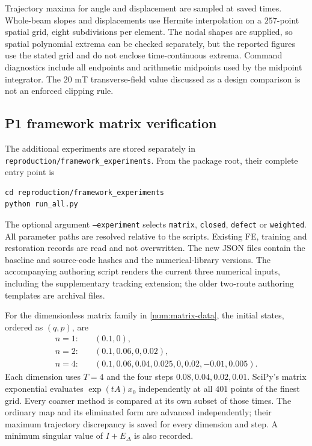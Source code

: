 Trajectory maxima for angle and displacement are sampled at saved
times. Whole-beam slopes and displacements use Hermite interpolation
on a $257$-point spatial grid, eight subdivisions per element.
The nodal shapes are supplied, so spatial polynomial extrema can
be checked separately, but the reported figures use the stated
grid and do not enclose time-continuous extrema.
Command diagnostics include all endpoints and arithmetic midpoints
used by the midpoint integrator. The $20$ mT transverse-field value
discussed as a design comparison is not an enforced clipping rule.

\subsection{P1 framework matrix verification}
\label{sx:framework-matrix}
The additional experiments are stored separately in
\texttt{reproduction/framework\_experiments}. From the package root,
their complete entry point is
\begin{verbatim}
cd reproduction/framework_experiments
python run_all.py
\end{verbatim}
The optional argument \texttt{--experiment} selects
\texttt{matrix}, \texttt{closed}, \texttt{defect} or \texttt{weighted}.
All parameter paths are resolved relative to the scripts. Existing FE,
training and restoration records are read and not overwritten.
The new JSON files contain the baseline and source-code hashes and the
numerical-library versions. The accompanying authoring script renders
the current three numerical inputs, including the supplementary tracking
extension; the older two-route authoring templates are archival files.

For the dimensionless matrix family in \eqref{num:matrix-data}, the
initial states, ordered as $(q,p)$, are
\begin{align*}
 n=1:&\quad (0.1,0),\\
 n=2:&\quad (0.1,0.06,0,0.02),\\
 n=4:&\quad (0.1,0.06,0.04,0.025,0,0.02,-0.01,0.005).
\end{align*}
Each dimension uses $T=4$ and the four steps
$0.08,0.04,0.02,0.01$. SciPy's matrix exponential evaluates
$\exp(tA)x_0$ independently at all $401$ points of the finest grid.
Every coarser method is compared at its own subset of those times.
The ordinary map and its eliminated form are advanced independently;
their maximum trajectory discrepancy is saved for every dimension and
step. A minimum singular value of $I+E_\Delta$ is also recorded.

